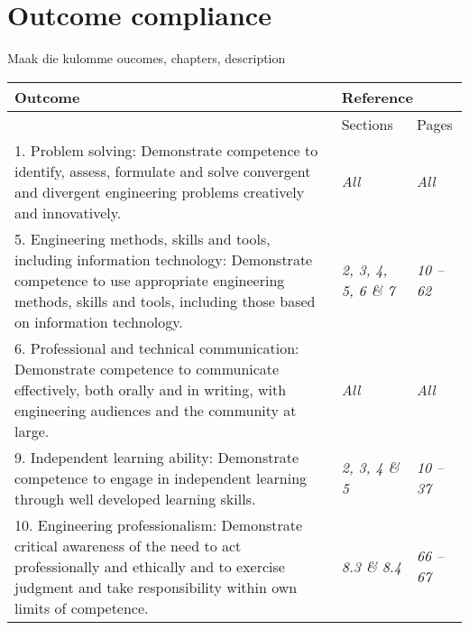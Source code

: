\chapter{Outcome compliance}
\label{ap:outCompliance}
\graphicspath{{Appendix2/Appendix2figures/}}

Maak die kulomme oucomes, chapters, description

\begin{tabular}{|p{8.3cm}|p{2.7cm}|p{1.5cm}|}
\hline
\textbf{Outcome}&\multicolumn{2}{|l|}{\textbf{Reference}}\\
\hline
& Sections & Pages\\
\hline
1. Problem solving: Demonstrate competence to identify, assess, formulate and solve convergent and divergent engineering problems creatively and innovatively. & \textit{All} & \textit{All}\\
\hline
5. Engineering methods, skills and tools, including information technology: Demonstrate competence to use appropriate engineering methods, skills and tools, including those based on information technology. & \textit{2, 3, 4, 5, 6 \& 7} & \textit{10 -- 62}\\
\hline
6. Professional and technical communication: Demonstrate competence to communicate ef{f}ectively, both orally and in writing, with engineering audiences and the community at large. & \textit{All} & \textit{All}\\
\hline
9. Independent learning ability: Demonstrate competence to engage in independent learning through well developed learning skills. & \textit{2, 3, 4 \& 5} &  \textit{10 -- 37}     \\
\hline
10. Engineering professionalism: Demonstrate critical awareness of the need to act professionally and ethically and to exercise judgment and take responsibility within own limits of competence. &\textit{8.3 \& 8.4}  &  \textit{66 -- 67}        \\
\hline
\end{tabular}


